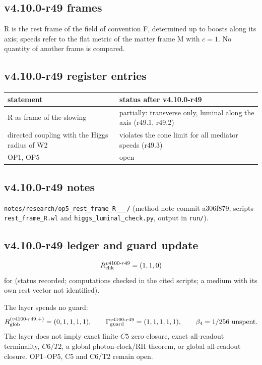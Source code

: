 \subsection*{v4.10.0-r49 frames}
\label{subsec:v4100-r49-frames}

R is the rest frame of the field of convention F, determined up to boosts along its axis; speeds refer to the flat metric of the matter frame M with
\(c=1\).  No quantity of another frame is compared.

\subsection*{v4.10.0-r49 register entries}
\label{subsec:v4100-r49-register}

\begin{center}
\small
\begin{tabular}{@{}>{\raggedright\arraybackslash}p{}>{\raggedright\arraybackslash}p{}@{}}
\toprule
statement & status after v4.10.0-r49\\
\midrule
R as frame of the slowing & partially: transverse only, luminal along the axis (r49.1, r49.2)\\
directed coupling with the Higgs radius of W2 & violates the cone limit for all mediator speeds (r49.3)\\
OP1, OP5 & open\\
\bottomrule
\end{tabular}
\end{center}

\subsection*{v4.10.0-r49 notes}
\label{subsec:v4100-r49-notes}

\texttt{notes/\allowbreak research/\allowbreak op5\_\allowbreak rest\_\allowbreak frame\_\allowbreak R\_\_\_/} (method note commit a306f879,
scripts \texttt{rest\_\allowbreak frame\_\allowbreak R.wl} and \texttt{higgs\_\allowbreak luminal\_\allowbreak check.py}, output in \texttt{run/}).

\subsection*{v4.10.0-r49 ledger and guard update}
\label{subsec:v4100-r49-ledger-guard}

\[
R_{\rm chk}^{v4100\text{-}r49}=(1,1,0)
\]
for (status recorded; computations checked in the cited scripts; a medium with its own rest vector not identified).

The layer spends no guard:
\[
R_{\rm glob}^{(v4100\text{-}r49,+)}=(0,1,1,1,1),
\qquad
\Gamma_{\rm guard}^{v4100\text{-}r49}=(1,1,1,1,1),
\qquad
\beta_4=1/256\ \text{unspent}.
\]
The layer does not imply exact finite \(C5\) zero closure, exact all-readout terminality, \(C6/T2\), a global photon-clock/RH theorem,
or global all-readout closure.  OP1--OP5, C5 and C6/T2 remain open.
